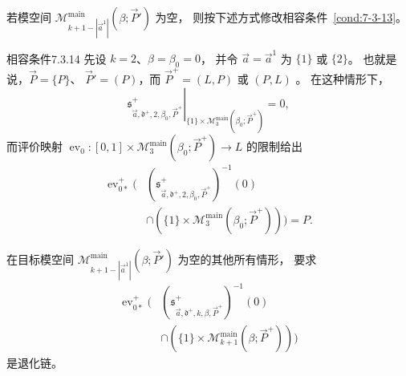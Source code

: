 若模空间
$\mathcal M^{\mathrm{main}}_{k+1-|\vec a^1|}
(\beta;\vec P')$ 为空，
则按下述方式修改相容条件~\ref{cond:7-3-13}。

\begin{statement}{相容条件}{7.3.14}\label{cond:7-3-14}
先设 $k=2$、$\beta=\beta_0=0$，
并令 $\vec a=\vec a^1$ 为
$\{1\}$ 或 $\{2\}$。
也就是说，$\vec P=\{P\}$、
$\vec P'=(P)$，而
$\vec P^+=(L,P)$ 或 $(P,L)$
。
在这种情形下，
\[
\left.\mathfrak s^+_{\vec a,\mathfrak d^+,2,
\beta_0,\vec P^+}\right|_{
\{1\}\times\mathcal M^{\mathrm{main}}_3
(\beta_0;\vec P^+)}=0,
\]
而评价映射
$\operatorname{ev}_0\colon
[0,1]\times\mathcal M^{\mathrm{main}}_3
(\beta_0;\vec P^+)\to L$
的限制给出
\[
\begin{aligned}
\operatorname{ev}_{0*}^+\bigl(&
(\mathfrak s^+_{\vec a,\mathfrak d^+,2,
\beta_0,\vec P^+})^{-1}(0)\\
&\cap
(\{1\}\times\mathcal M^{\mathrm{main}}_3
(\beta_0;\vec P^+))\bigr)=P.
\end{aligned}
\]

在目标模空间
$\mathcal M^{\mathrm{main}}_{k+1-|\vec a^1|}
(\beta;\vec P')$ 为空的其他所有情形，
要求
\[
\begin{aligned}
\operatorname{ev}_{0*}^+\bigl(&
(\mathfrak s^+_{\vec a,\mathfrak d^+,k,
\beta,\vec P^+})^{-1}(0)\\
&\cap
(\{1\}\times\mathcal M^{\mathrm{main}}_{k+1}
(\beta;\vec P^+))\bigr)
\end{aligned}
\]
是退化链。
\end{statement}

